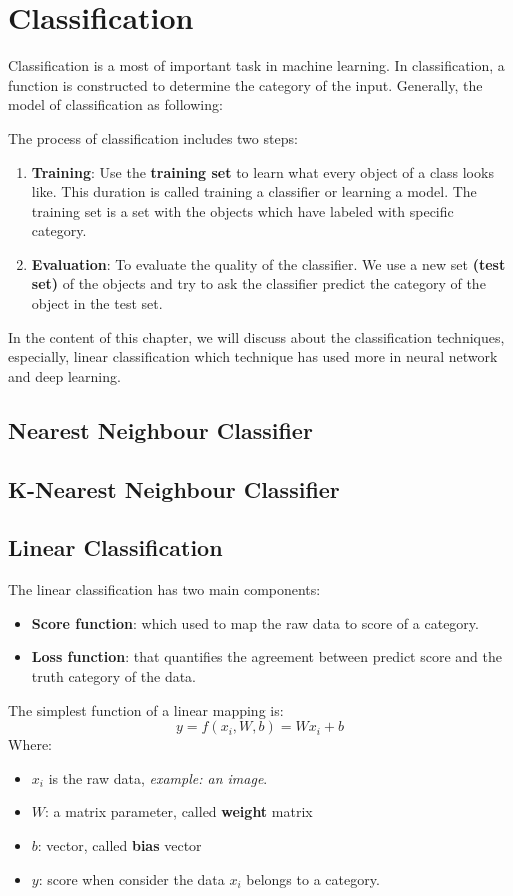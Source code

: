\chapter{Classification}
Classification is a most of important task in machine learning. In classification, a function is constructed to determine the category of the input. Generally, the model of classification as following:

The process of classification includes two steps:
\begin{enumerate}
	\item \textbf{Training}: Use the \textbf{training set} to learn what every object of a class looks like. This duration is called training a classifier or learning a model. The training set is a set with the objects which have labeled with specific category.
	\item \textbf{Evaluation}: To evaluate the quality of the classifier. We use a new set \textbf{(test set)} of the objects and try to ask the classifier predict the category of the object in the test set.
\end{enumerate}
In the content of this chapter, we will discuss about the classification techniques, especially, linear classification which technique has used more in neural network and deep learning.
\section{Nearest Neighbour Classifier}
\section{K-Nearest Neighbour Classifier}
\section{Linear Classification}
The linear classification has two main components: 
\begin{itemize}
	\item \textbf{Score function}:  which used to map the raw data to score of a category.
	\item \textbf{Loss function}: that quantifies the agreement between predict score and the truth category of the data.
\end{itemize}
The simplest function of a linear mapping is:
\begin{equation}
	y = f(x_i,W,b) = Wx_i + b
\end{equation}
Where:
\begin{itemize}
	\item $x_i$ is the raw data, \textit{example: an image}.
	\item $W$: a matrix parameter, called \textbf{weight} matrix
	\item $b$: vector, called \textbf{bias} vector
	\item $y$: score when consider the data $x_i$ belongs to a category.
\end{itemize}